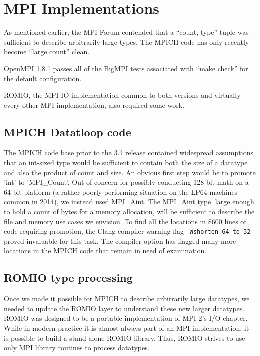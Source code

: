 
\section{MPI Implementations}
As mentioned earlier, the MPI Forum contended that a ``count, type''
tuple was sufficient to describe
arbitrarily large types.  The MPICH code has only recently become
``large count'' clean.

OpenMPI 1.8.1 passes all of the BigMPI tests associated with
``make check'' for the default configuration.

ROMIO, the MPI-IO implementation common to both versions and
virtually every other MPI implementation, also required some work.

\subsection{MPICH Datatloop code}
The MPICH code base prior to the
3.1 release contained widespread assumptions that an int-sized type
would be sufficient to contain both the size of a datatype and also the product
of count and size.   An obvious first step would be to promote 'int' to 'MPI\_Count'.
Out of concern for possibly conducting 128-bit math on a 64 bit platform (a
rather poorly performing situation on the LP64 machines common in 2014),
we instead used MPI\_Aint.  The MPI\_Aint type, large enough to hold a
count of bytes for a memory allocation, will be sufficient to describe the file
and memory use cases we envision.  To find all the locations in 8600 lines of
code requiring promotion, the Clang compiler warning flag
\texttt{-Wshorten-64-to-32} proved invaluable for this task.  The compiler option has
flagged many more
locations in the MPICH code that remain in need of examination.

\subsection{ROMIO type processing}

Once we made it possible for MPICH to describe arbitrarily large datatypes, we
needed to update the ROMIO layer to understand these new larger datatypes.
ROMIO \cite{thakur:mpi-io-implement} was designed to be a portable
 implementation of MPI-2's I/O
chapter.  While in modern practice it is almost always part of an MPI
implementation, it is possible to build a stand-alone ROMIO library.  Thus,
ROMIO strives to use only MPI library routines to process datatypes.

